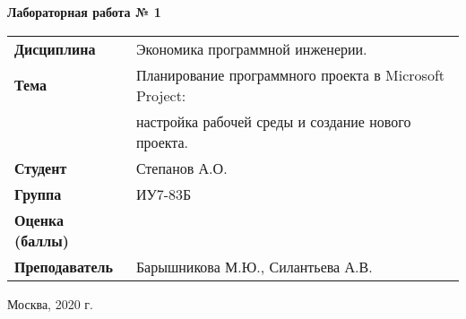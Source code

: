 \begin{center}
    \textbf{Лабораторная работа № 1} \\
    \vspace{0.5cm}
\end{center}

\vspace{4cm}

\begin{flushleft}
    \begin{tabular}{ll}
        \textbf{Дисциплина} & Экономика программной инженерии. \\
        \textbf{Тема} & Планирование программного проекта в Microsoft Project: \\
        & настройка рабочей среды и создание нового проекта. \\
        \textbf{Студент} & Степанов А.О. \\
        \textbf{Группа} & ИУ7-83Б \\
        \textbf{Оценка (баллы)} & \\
        \textbf{Преподаватель} & Барышникова М.Ю., Силантьева А.В. \\
    \end{tabular}
\end{flushleft}

\vspace{4cm}

\begin{center}
    Москва, 2020 г.
\end{center}
